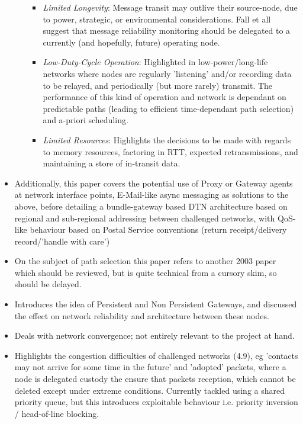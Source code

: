 \begin{itemize}
\begin{itemize}
    \begin{itemize}
      \item \emph{Limited Longevity}: Message transit may outlive their
      source-node, due to power, strategic, or environmental considerations.
      Fall et all suggest that message reliability monitoring should be
      delegated to a currently (and hopefully, future) operating node.
      \item \emph{Low-Duty-Cycle Operation}: Highlighted in low-power/long-life
      networks where nodes are regularly 'listening' and/or recording data to be
      relayed, and periodically (but more rarely) transmit. The performance of
      this kind of operation and network is dependant on predictable paths
      (leading to efficient time-dependant path selection) and a-priori
      scheduling.
      \item \emph{Limited Resources}: Highlights the decisions to be made with
      regards to memory resources, factoring in RTT, expected retransmissions,
      and maintaining a store of in-transit data.
	\end{itemize}
  \end{itemize}
  \item Additionally, this paper covers the potential use of Proxy or Gateway
  agents at network interface points, E-Mail-like async messaging as
  solutions to the above, before detailing a bundle-gateway based DTN
  architecture based on regional and sub-regional addressing between challenged
  networks, with QoS-like behaviour based on Postal Service conventions (return
  receipt/delivery record/'handle with care')
  \item On the subject of path selection this paper refers to another 2003
  paper\cite{Alonso2003a} which should be reviewed, but is quite technical from
  a cursory skim, so should be delayed.
  \item Introduces the idea of Persistent and Non Persistent Gateways, and
  discussed the effect on network reliability and architecture between these
  nodes.
  \item Deals with network convergence; not entirely relevant to the project at
  hand.
  \item Highlights the congestion difficulties of challenged networks (4.9), eg
  'contacts may not arrive for some time in the future' and 'adopted' packets,
  where a node is delegated custody the ensure that packets reception, which
  cannot be deleted except under extreme conditions. Currently tackled using a
  shared priority queue, but this introduces exploitable behaviour i.e. priority
  inversion / head-of-line blocking.
\end{itemize}

